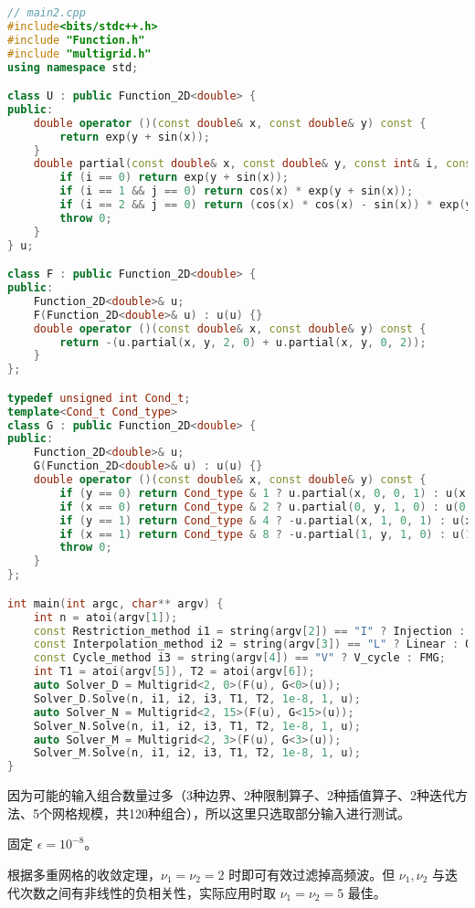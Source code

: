 \documentclass{ctexart}
\begin{document}
\begin{lstlisting}[language=c++]
// main2.cpp
#include<bits/stdc++.h>
#include "Function.h"
#include "multigrid.h"
using namespace std;

class U : public Function_2D<double> {
public:
	double operator ()(const double& x, const double& y) const {
		return exp(y + sin(x));
	}
	double partial(const double& x, const double& y, const int& i, const int& j) const {
		if (i == 0) return exp(y + sin(x));
		if (i == 1 && j == 0) return cos(x) * exp(y + sin(x));
		if (i == 2 && j == 0) return (cos(x) * cos(x) - sin(x)) * exp(y + sin(x));
		throw 0;
	}
} u;

class F : public Function_2D<double> {
public:
	Function_2D<double>& u;
	F(Function_2D<double>& u) : u(u) {}
	double operator ()(const double& x, const double& y) const {
		return -(u.partial(x, y, 2, 0) + u.partial(x, y, 0, 2));
	}
};

typedef unsigned int Cond_t;
template<Cond_t Cond_type>
class G : public Function_2D<double> {
public:
	Function_2D<double>& u;
	G(Function_2D<double>& u) : u(u) {}
	double operator ()(const double& x, const double& y) const {
		if (y == 0) return Cond_type & 1 ? u.partial(x, 0, 0, 1) : u(x, 0);
		if (x == 0) return Cond_type & 2 ? u.partial(0, y, 1, 0) : u(0, y) ;
		if (y == 1) return Cond_type & 4 ? -u.partial(x, 1, 0, 1) : u(x, 1);
		if (x == 1) return Cond_type & 8 ? -u.partial(1, y, 1, 0) : u(1, y);
		throw 0;
	}
};

int main(int argc, char** argv) {
	int n = atoi(argv[1]);
	const Restriction_method i1 = string(argv[2]) == "I" ? Injection : Full_Weighting;
	const Interpolation_method i2 = string(argv[3]) == "L" ? Linear : Quadratic;
	const Cycle_method i3 = string(argv[4]) == "V" ? V_cycle : FMG;
	int T1 = atoi(argv[5]), T2 = atoi(argv[6]);
	auto Solver_D = Multigrid<2, 0>(F(u), G<0>(u));
	Solver_D.Solve(n, i1, i2, i3, T1, T2, 1e-8, 1, u);
	auto Solver_N = Multigrid<2, 15>(F(u), G<15>(u));
	Solver_N.Solve(n, i1, i2, i3, T1, T2, 1e-8, 1, u);
	auto Solver_M = Multigrid<2, 3>(F(u), G<3>(u));
	Solver_M.Solve(n, i1, i2, i3, T1, T2, 1e-8, 1, u);
}
\end{lstlisting}

因为可能的输入组合数量过多（3种边界、2种限制算子、2种插值算子、2种迭代方法、5个网格规模，共120种组合），所以这里只选取部分输入进行测试。

固定 $\epsilon = 10^{-8}$。

根据多重网格的收敛定理，$\nu_1=\nu_2=2$ 时即可有效过滤掉高频波。但 $\nu_1,\nu_2$ 与迭代次数之间有非线性的负相关性，实际应用时取 $\nu_1=\nu_2=5$ 最佳。
\end{document}

